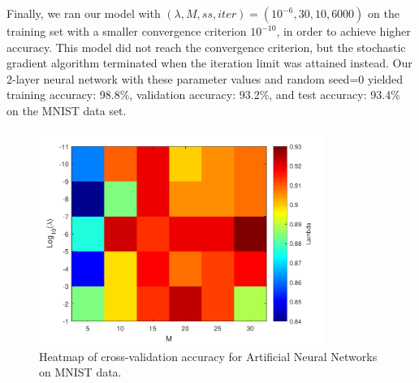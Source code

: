 Finally, we ran our model with $(\lambda, M, ss, iter) = (10^{-6}, 30, 10, 6000)$ on the training set with a smaller convergence criterion $10^{-10}$, in order to achieve higher accuracy. This model did not reach the convergence criterion, but the stochastic gradient algorithm terminated when the iteration limit was attained instead.  Our 2-layer neural network with these parameter values and random seed=0 yielded training accuracy: 98.8\%, validation accuracy: 93.2\%, and test accuracy: 93.4\% on the MNIST data set.  

\begin{figure}
\centering
	\includegraphics[height=70mm]{mnist_cv.pdf}
    \caption{Heatmap of cross-validation accuracy for Artificial Neural Networks on MNIST data.}  \label{fig:mnist_cv}  
\end{figure}
